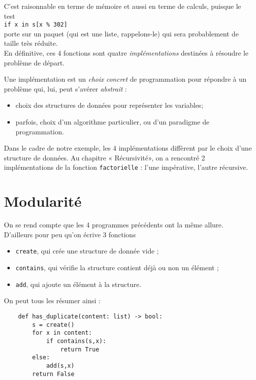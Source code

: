 \documentclass[a4paper,10pt,cours]{nsi}
\begin{document}
C'est raisonnable en terme de mémoire et aussi en terme de calculs, puisque le test\\ \texttt{if x in s[x \% 302]}\\
porte sur un paquet (qui est une liste, rappelons-le) qui sera probablement de taille très réduite.\\

En définitive, ces 4 fonctions sont quatre \textit{implémentations} destinées à résoudre le problème de départ.

\begin{definition}[ : implémentation]
    Une implémentation est un \textit{choix concret} de programmation pour répondre à un problème qui, lui, peut s'avérer \textit{abstrait} :
    \begin{itemize}
        \item 	choix des structures de données pour représenter les variables;
        \item 	parfois, choix d'un algorithme particulier, ou d'un paradigme de programmation.
    \end{itemize}
\end{definition}

Dans le cadre de notre exemple, les 4 implémentations diffèrent par le choix d'une structure de données. Au chapitre « Récursivité», on a rencontré 2 implémentations de la fonction \texttt{factorielle} : l'une impérative, l'autre récursive.


\section{Modularité}

On se rend compte que les 4 programmes précédents ont la même allure. D'ailleurs pour peu qu'on écrive 3 fonctions
\begin{itemize}
    \item 	\texttt{create}, qui crée une structure de donnée vide ;
    \item 	\texttt{contains}, qui vérifie la structure contient déjà ou non un élément ;
    \item	\texttt{add}, qui ajoute un élément à la structure.
\end{itemize}
On peut tous les résumer ainsi :

\begin{pyc}
    \begin{verbatim}
    def has_duplicate(content: list) -> bool:
        s = create()
        for x in content:
            if contains(s,x):
                return True
        else:
            add(s,x)
        return False
\end{verbatim}
\end{pyc}
\end{document}
